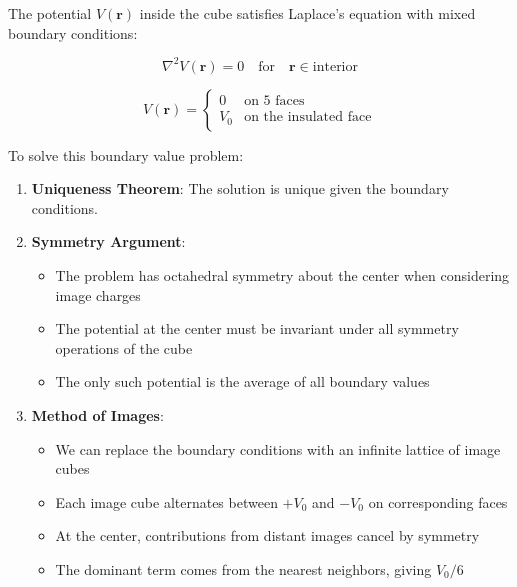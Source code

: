 \documentclass[a4paper]{article}
\begin{document}
\begin{tcolorbox}[
    title=Solution,
    colback=white,
    colframe=myblue,
    coltitle=black,
    fonttitle=\bfseries\large,
    breakable,
    enhanced,
    attach boxed title to top center={yshift=-2mm},
    boxed title style={colback=myblue!20, colframe=myblue}
]
The potential $V(\textbf{r})$ inside the cube satisfies Laplace's equation with mixed boundary conditions:

\[
\nabla^2 V(\textbf{r}) = 0 \quad \text{for} \quad \textbf{r} \in \text{interior}
\]

\begin{equation}
V(\textbf{r}) = \begin{cases}
0 & \text{on 5 faces} \\
V_0 & \text{on the insulated face}
\end{cases}
\end{equation}

\noindent To solve this boundary value problem:

\begin{enumerate}
\item \textbf{Uniqueness Theorem}: The solution is unique given the boundary conditions.

\item \textbf{Symmetry Argument}:
\begin{itemize}
\item The problem has octahedral symmetry about the center when considering image charges
\item The potential at the center must be invariant under all symmetry operations of the cube
\item The only such potential is the average of all boundary values
\end{itemize}

\item \textbf{Method of Images}:
\begin{itemize}
\item We can replace the boundary conditions with an infinite lattice of image cubes
\item Each image cube alternates between $+V_0$ and $-V_0$ on corresponding faces
\item At the center, contributions from distant images cancel by symmetry
\item The dominant term comes from the nearest neighbors, giving $V_0/6$
\end{itemize}

\end{enumerate}


\end{tcolorbox}
\end{document}
